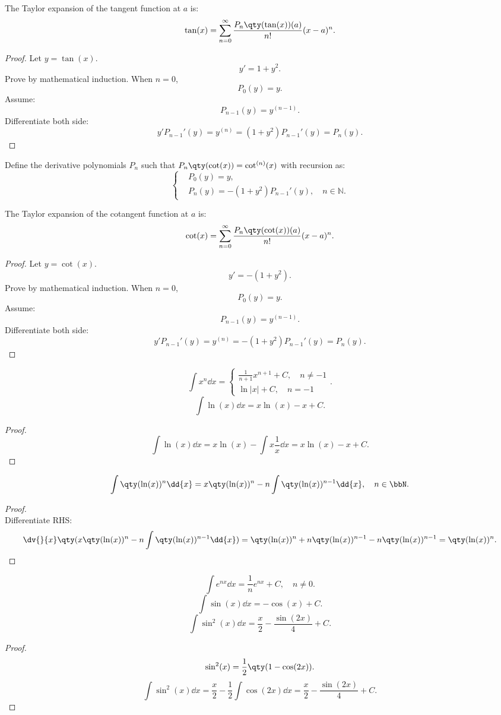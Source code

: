 \documentclass[a4paper,12pt]{report}
\begin{document}
\begin{itemize}
\begin{itemize}
The Taylor expansion of the tangent function at $a$ is:
\[\tan(x)=\sum_{n=0}^{\infty}\frac{P_n\qty(\tan(x))(a)}{n!}(x-a)^n.\]
\begin{proof}\mbox{}
Let $y=\tan(x)$.
\[y'=1+y^2.\]
Prove by mathematical induction. When $n=0$,
\[P_0(y)=y.\]
Assume:
\[P_{n-1}(y)=y^{(n-1)}.\]
Differentiate both side:
\[y'P_{n-1}'(y)=y^{(n)}=(1+y^2)P_{n-1}'(y)=P_n(y).\]
\end{proof}
Define the derivative polynomials $P_n$ such that $P_n\qty(\cot(x))=\cot^{(n)}(x)$ with recursion as:
\[\begin{cases}
&P_0(y)=y,\\
&P_n(y)=-(1+y^2)P_{n-1}'(y),\quad n\in\mathbb{N}.
\end{cases}\]

The Taylor expansion of the cotangent function at $a$ is:
\[\cot(x)=\sum_{n=0}^{\infty}\frac{P_n\qty(\cot(x))(a)}{n!}(x-a)^n.\]
\begin{proof}\mbox{}
Let $y=\cot(x)$.
\[y'=-(1+y^2).\]
Prove by mathematical induction. When $n=0$,
\[P_0(y)=y.\]
Assume:
\[P_{n-1}(y)=y^{(n-1)}.\]
Differentiate both side:
\[y'P_{n-1}'(y)=y^{(n)}=-(1+y^2)P_{n-1}'(y)=P_n(y).\]
\end{proof}
\[\int x^n\dd{x}=\begin{cases}\frac{1}{n+1}x^{n+1}+C,\quad n\neq -1\\\ln|x|+C,\quad n=-1\end{cases}.\]
\[\int\ln(x)\dd{x}=x\ln(x)-x+C.\]
\begin{proof}
    \[\int\ln(x)\dd{x}=x\ln(x)-\int x\frac{1}{x}\dd{x}=x\ln(x)-x+C.\]
\end{proof}
\[\int\qty(\ln(x))^n\dd{x}=x\qty(\ln(x))^n-n\int\qty(\ln(x))^{n-1}\dd{x},\quad n\in\bbN.\]
\begin{proof}\mbox{}\\
    Differentiate RHS:
    \[\dv{}{x}\qty(x\qty(\ln(x))^n-n\int\qty(\ln(x))^{n-1}\dd{x})=\qty(\ln(x))^n+n\qty(\ln(x))^{n-1}-n\qty(\ln(x))^{n-1}=\qty(\ln(x))^n.\]
\end{proof}
\[\int e^{nx}\dd{x}=\frac{1}{n}e^{nx}+C,\quad n\neq 0.\]
\[\int\sin(x)\dd{x}=-\cos(x)+C.\]
\[\int\sin^2(x)\dd{x}=\frac{x}{2}-\frac{\sin(2x)}{4}+C.\]
\begin{proof}
    \[\sin^2(x)=\frac{1}{2}\qty(1-\cos(2x)).\]
    \[\int\sin^2(x)\dd{x}=\frac{x}{2}-\frac{1}{2}\int\cos(2x)\dd{x}=\frac{x}{2}-\frac{\sin(2x)}{4}+C.\]

\end{proof}
\end{itemize}
\end{itemize}
\end{document}
